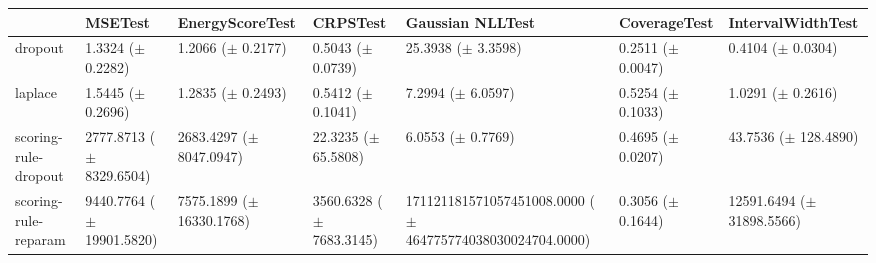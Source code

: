 \begin{tabular}{lllllll}
\toprule
 & MSETest & EnergyScoreTest & CRPSTest & Gaussian NLLTest & CoverageTest & IntervalWidthTest \\
\midrule
dropout & \makecell{1.3324 \\ ($\pm$ 0.2282)} & \makecell{1.2066 \\ ($\pm$ 0.2177)} & \makecell{0.5043 \\ ($\pm$ 0.0739)} & \makecell{25.3938 \\ ($\pm$ 3.3598)} & \makecell{0.2511 \\ ($\pm$ 0.0047)} & \makecell{0.4104 \\ ($\pm$ 0.0304)} \\
laplace & \makecell{1.5445 \\ ($\pm$ 0.2696)} & \makecell{1.2835 \\ ($\pm$ 0.2493)} & \makecell{0.5412 \\ ($\pm$ 0.1041)} & \makecell{7.2994 \\ ($\pm$ 6.0597)} & \makecell{0.5254 \\ ($\pm$ 0.1033)} & \makecell{1.0291 \\ ($\pm$ 0.2616)} \\
scoring-rule-dropout & \makecell{2777.8713 \\ ($\pm$ 8329.6504)} & \makecell{2683.4297 \\ ($\pm$ 8047.0947)} & \makecell{22.3235 \\ ($\pm$ 65.5808)} & \makecell{6.0553 \\ ($\pm$ 0.7769)} & \makecell{0.4695 \\ ($\pm$ 0.0207)} & \makecell{43.7536 \\ ($\pm$ 128.4890)} \\
scoring-rule-reparam & \makecell{9440.7764 \\ ($\pm$ 19901.5820)} & \makecell{7575.1899 \\ ($\pm$ 16330.1768)} & \makecell{3560.6328 \\ ($\pm$ 7683.3145)} & \makecell{171121181571057451008.0000 \\ ($\pm$ 464775774038030024704.0000)} & \makecell{0.3056 \\ ($\pm$ 0.1644)} & \makecell{12591.6494 \\ ($\pm$ 31898.5566)} \\
\bottomrule
\end{tabular}
